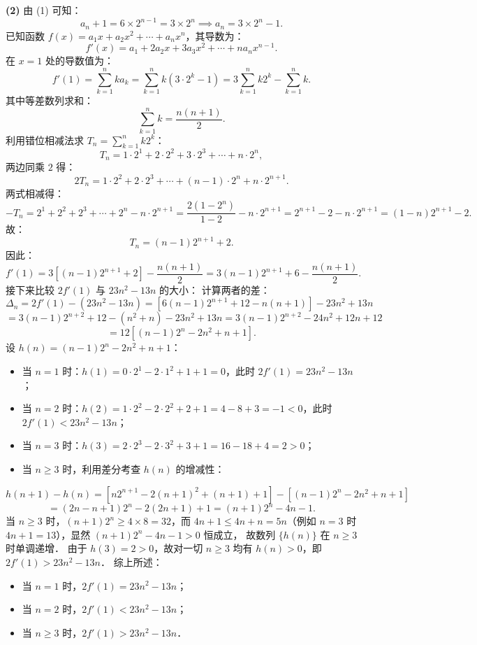 \begin{answer}
\textbf{(2)}
由 (1) 可知：
\nopagebreak[4]
\[
a_n + 1 = 6 \times 2^{n-1} = 3 \times 2^n \implies a_n = 3 \times 2^n - 1.
\]
已知函数 $f(x) = a_1 x + a_2 x^2 + \cdots + a_n x^n$，其导数为：
\nopagebreak[4]
\[
f'(x) = a_1 + 2a_2 x + 3a_3 x^2 + \cdots + n a_n x^{n-1}.
\]
在 $x = 1$ 处的导数值为：
\nopagebreak[4]
\[
f'(1) = \sum_{k=1}^n k a_k = \sum_{k=1}^n k (3 \cdot 2^k - 1) = 3 \sum_{k=1}^n k 2^k - \sum_{k=1}^n k.
\]
其中等差数列求和：
\nopagebreak[4]
\[
\sum_{k=1}^n k = \dfrac{n(n+1)}{2}.
\]
利用错位相减法求 $T_n = \sum_{k=1}^n k 2^k$：
\nopagebreak[4]
\[
T_n = 1 \cdot 2^1 + 2 \cdot 2^2 + 3 \cdot 2^3 + \cdots + n \cdot 2^n,
\]
两边同乘 $2$ 得：
\nopagebreak[4]
\[
2T_n = 1 \cdot 2^2 + 2 \cdot 2^3 + \cdots + (n-1) \cdot 2^n + n \cdot 2^{n+1}.
\]
两式相减得：
\nopagebreak[4]
\[
-T_n = 2^1 + 2^2 + 2^3 + \cdots + 2^n - n \cdot 2^{n+1} = \dfrac{2(1 - 2^n)}{1 - 2} - n \cdot 2^{n+1} = 2^{n+1} - 2 - n \cdot 2^{n+1} = (1-n)2^{n+1} - 2.
\]
故：
\nopagebreak[4]
\[
T_n = (n-1)2^{n+1} + 2.
\]
因此：
\nopagebreak[4]
\[
f'(1) = 3\left[(n-1)2^{n+1} + 2\right] - \dfrac{n(n+1)}{2} = 3(n-1)2^{n+1} + 6 - \dfrac{n(n+1)}{2}.
\]
接下来比较 $2f'(1)$ 与 $23n^2 - 13n$ 的大小：
计算两者的差：
\nopagebreak[4]
\[
\Delta_n = 2f'(1) - (23n^2 - 13n) = \left[6(n-1)2^{n+1} + 12 - n(n+1)\right] - 23n^2 + 13n
\]
\nopagebreak[4]
\[
= 3(n-1)2^{n+2} + 12 - (n^2 + n) - 23n^2 + 13n = 3(n-1)2^{n+2} - 24n^2 + 12n + 12
\]
\nopagebreak[4]
\[
= 12 \left[(n-1)2^n - 2n^2 + n + 1\right].
\]
设 $h(n) = (n-1)2^n - 2n^2 + n + 1$：
\begin{itemize}
\item 当 $n = 1$ 时：$h(1) = 0 \cdot 2^1 - 2 \cdot 1^2 + 1 + 1 = 0$，此时 $2f'(1) = 23n^2 - 13n$；
\item 当 $n = 2$ 时：$h(2) = 1 \cdot 2^2 - 2 \cdot 2^2 + 2 + 1 = 4 - 8 + 3 = -1 < 0$，此时 $2f'(1) < 23n^2 - 13n$；
\item 当 $n = 3$ 时：$h(3) = 2 \cdot 2^3 - 2 \cdot 3^2 + 3 + 1 = 16 - 18 + 4 = 2 > 0$；
\item 当 $n \geqslant 3$ 时，利用差分考查 $h(n)$ 的增减性：
\end{itemize}
\nopagebreak[4]
\[
h(n+1) - h(n) = \left[n 2^{n+1} - 2(n+1)^2 + (n+1) + 1\right] - \left[(n-1)2^n - 2n^2 + n + 1\right]
\]
\nopagebreak[4]
\[
= (2n - n + 1)2^n - 2(2n + 1) + 1 = (n+1)2^n - 4n - 1.
\]
当 $n \geqslant 3$ 时，$(n+1)2^n \geqslant 4 \times 8 = 32$，而 $4n + 1 \leqslant 4n + n = 5n$（例如 $n=3$ 时 $4n+1 = 13$），显然 $(n+1)2^n - 4n - 1 > 0$ 恒成立，
故数列 $\{h(n)\}$ 在 $n \geqslant 3$ 时单调递增．
由于 $h(3) = 2 > 0$，故对一切 $n \geqslant 3$ 均有 $h(n) > 0$，即 $2f'(1) > 23n^2 - 13n$．
综上所述：
\begin{itemize}
\item 当 $n = 1$ 时，$2f'(1) = 23n^2 - 13n$；
\item 当 $n = 2$ 时，$2f'(1) < 23n^2 - 13n$；
\item 当 $n \geqslant 3$ 时，$2f'(1) > 23n^2 - 13n$．
\end{itemize}


\end{answer}

